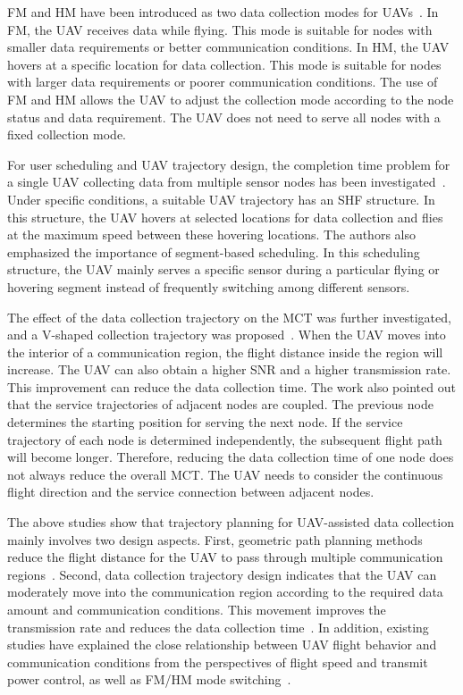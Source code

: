 \documentclass[12pt]{ksthesis}
\begin{document}
\begin{thesis}
{    FM and HM have been introduced as two data collection modes for UAVs~\cite{Wang2020CollaborativeUAVs}. In FM, the UAV receives data while flying. This mode is suitable for nodes with smaller data requirements or better communication conditions. In HM, the UAV hovers at a specific location for data collection. This mode is suitable for nodes with larger data requirements or poorer communication conditions. The use of FM and HM allows the UAV to adjust the collection mode according to the node status and data requirement. The UAV does not need to serve all nodes with a fixed collection mode.

    For user scheduling and UAV trajectory design, the completion time problem for a single UAV collecting data from multiple sensor nodes has been investigated~\cite{Yuan2023CompletionTime}. Under specific conditions, a suitable UAV trajectory has an SHF structure. In this structure, the UAV hovers at selected locations for data collection and flies at the maximum speed between these hovering locations. The authors also emphasized the importance of segment-based scheduling. In this scheduling structure, the UAV mainly serves a specific sensor during a particular flying or hovering segment instead of frequently switching among different sensors.

    The effect of the data collection trajectory on the MCT was further investigated, and a V-shaped collection trajectory was proposed~\cite{Li2022MCT}. When the UAV moves into the interior of a communication region, the flight distance inside the region will increase. The UAV can also obtain a higher SNR and a higher transmission rate. This improvement can reduce the data collection time. The work also pointed out that the service trajectories of adjacent nodes are coupled. The previous node determines the starting position for serving the next node. If the service trajectory of each node is determined independently, the subsequent flight path will become longer. Therefore, reducing the data collection time of one node does not always reduce the overall MCT. The UAV needs to consider the continuous flight direction and the service connection between adjacent nodes.

    The above studies show that trajectory planning for UAV-assisted data collection mainly involves two design aspects. First, geometric path planning methods reduce the flight distance for the UAV to pass through multiple communication regions~\cite{Luo2021TrajectoryWSN, Li2020JointOptimization}. Second, data collection trajectory design indicates that the UAV can moderately move into the communication region according to the required data amount and communication conditions. This movement improves the transmission rate and reduces the data collection time~\cite{Li2022MCT, Fu2024CollectionPoint}. In addition, existing studies have explained the close relationship between UAV flight behavior and communication conditions from the perspectives of flight speed and transmit power control, as well as FM/HM mode switching~\cite{Gong2018FlightTimeMinimization, Wang2020CollaborativeUAVs, Yuan2023CompletionTime}.

}
\end{thesis}
\end{document}
